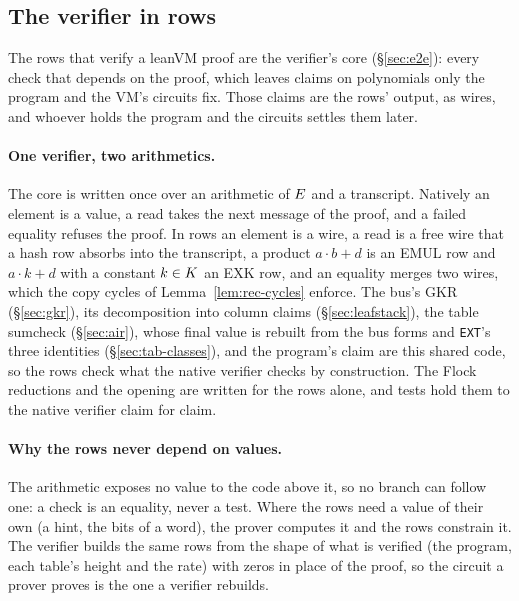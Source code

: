 \subsection{The verifier in rows}\label{rec:verifier}

The rows that verify a leanVM proof are the verifier's core (\S\ref{sec:e2e}): every check that depends on the proof, which leaves claims on polynomials only the program and the VM's circuits fix. Those claims are the rows' output, as wires, and whoever holds the program and the circuits settles them later.

\paragraph{One verifier, two arithmetics.} The core is written once over an arithmetic of $E$ and a transcript. Natively an element is a value, a read takes the next message of the proof, and a failed equality refuses the proof. In rows an element is a wire, a read is a free wire that a hash row absorbs into the transcript, a product $a\cdot b+d$ is an \textsf{EMUL} row and $a\cdot k+d$ with a constant $k\in K$ an \textsf{EXK} row, and an equality merges two wires, which the copy cycles of Lemma~\ref{lem:rec-cycles} enforce. The bus's GKR (\S\ref{sec:gkr}), its decomposition into column claims (\S\ref{sec:leafstack}), the table sumcheck (\S\ref{sec:air}), whose final value is rebuilt from the bus forms and \texttt{EXT}'s three identities (\S\ref{sec:tab-classes}), and the program's claim are this shared code, so the rows check what the native verifier checks by construction. The Flock reductions and the opening are written for the rows alone, and tests hold them to the native verifier claim for claim.

\paragraph{Why the rows never depend on values.} The arithmetic exposes no value to the code above it, so no branch can follow one: a check is an equality, never a test. Where the rows need a value of their own (a hint, the bits of a word), the prover computes it and the rows constrain it. The verifier builds the same rows from the shape of what is verified (the program, each table's height and the rate) with zeros in place of the proof, so the circuit a prover proves is the one a verifier rebuilds.

